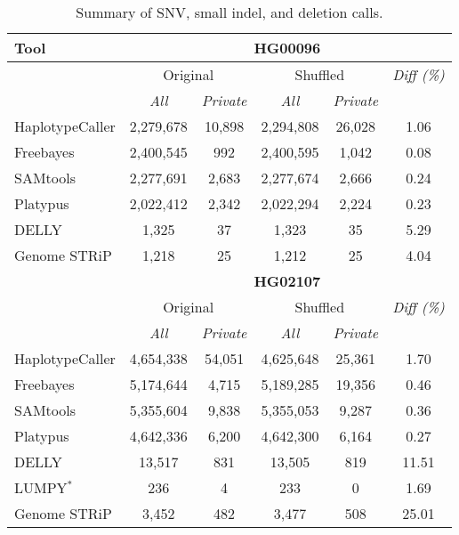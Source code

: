 \documentclass{bioinfo}
\begin{document}
\begin{table}[htb]
  \caption{Summary of SNV, small indel, and deletion calls.}
\begin{center}
\begin{tabular}{|l|c|c||c|c||c|}
\hline
{\bf Tool} & \multicolumn{5}{c|}{\bf HG00096} \\
\hline
{\bf } & \multicolumn{2}{c||}{Original} & \multicolumn{2}{c||}{Shuffled} & {\it Diff (\%) }\\
\cline{2-6}
{\bf } & {\it All } & {\it Private } & {\it All } & {\it Private } & {\it } \\
\hline
HaplotypeCaller & 2,279,678 & 10,898 & 2,294,808 & 26,028 & 1.06 \\
Freebayes & 2,400,545 & 992 & 2,400,595 & 1,042 & 0.08 \\
SAMtools & 2,277,691 & 2,683 & 2,277,674 & 2,666 & 0.24 \\
Platypus & 2,022,412 & 2,342 & 2,022,294 & 2,224 & 0.23 \\
DELLY & 1,325 & 37 & 1,323 & 35 & 5.29 \\
Genome STRiP & 1,218 & 25 & 1,212 & 25 & 4.04 \\
\hline
\hline
{\bf } & \multicolumn{5}{c|}{\bf HG02107} \\
\hline
{\bf } & \multicolumn{2}{c||}{Original} & \multicolumn{2}{c||}{Shuffled} & {\it Diff (\%) }\\
\cline{2-6}
{\bf } & {\it All } & {\it Private } & {\it All } & {\it Private } & {\it } \\
\hline
HaplotypeCaller & 4,654,338 & 54,051 & 4,625,648 & 25,361 & 1.70 \\
Freebayes & 5,174,644 & 4,715 & 5,189,285 & 19,356 & 0.46 \\
SAMtools & 5,355,604 & 9,838 & 5,355,053 & 9,287 & 0.36 \\
Platypus & 4,642,336 & 6,200 & 4,642,300 & 6,164 & 0.27 \\
DELLY & 13,517 & 831 & 13,505 & 819 & 11.51 \\
LUMPY$^*$ & 236 & 4 & 233 & 0 & 1.69 \\
Genome STRiP & 3,452 & 482 & 3,477 & 508 & 25.01 \\
\hline

\end{tabular}
\end{center}
\end{table}
\end{document}
